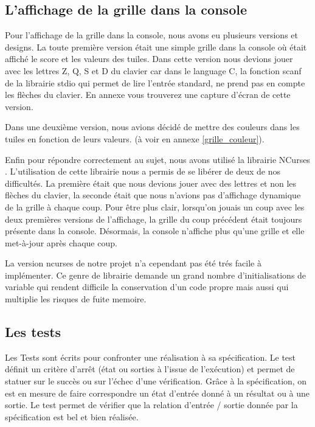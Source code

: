 \documentclass[12pt]{article}
\begin{document}
\subsection{L'affichage de la grille dans la console}
Pour l'affichage de la grille dans la console, nous avons eu plusieurs versions
et designs. La toute premi\`ere version \'etait une simple grille dans la console
o\`u \'etait affich\'e le score et les valeurs des tuiles. Dans cette version
nous devions jouer avec les lettres Z, Q, S et D du clavier car dans le language C, la
fonction \og scanf \fg{} de la librairie \og stdio \fg{} qui permet de
lire l'entr\'ee standard, ne prend pas en compte les fl\`eches du clavier.
En annexe vous trouverez une capture d'écran de cette version.\par
Dans une deuxi\`eme version, nous avions d\'ecid\'e de mettre des couleurs dans
les tuiles en fonction de leurs valeurs. (\`a voir en annexe \ref{grille_couleur}).\par
Enfin pour r\'epondre correctement au sujet, nous avons utilis\'e la librairie
\og NCurses \fg{}. L'utilisation de cette librairie nous a permis de se
lib\'erer de deux de nos difficult\'es. La premi\`ere \'etait que nous devions jouer
avec des lettres et non les fl\`eches du clavier, la seconde \'etait que nous
n'avions pas d'affichage dynamique de la grille \`a chaque coup. Pour \^etre plus
clair, lorsqu'on jouais un coup avec les deux premi\`eres versions de
l'affichage, la grille du coup pr\'ecédent \'etait toujours pr\'esente dans la
console. D\'esormais, la console n'affiche plus qu'une grille et elle met-\`a-jour apr\`es chaque coup.\par

La version ncurses de notre projet n'a cependant pas été trés facile à implémenter.
Ce genre de librairie demande un grand nombre d'initialisations de variable qui rendent
difficile la conservation d'un code propre mais aussi qui multiplie les risques de fuite memoire.

\subsection{Les tests}
Les Tests sont \'ecrits pour confronter une r\'ealisation \`a sa sp\'ecification.
Le test d\'efinit un crit\`ere d’arr\^et (\'etat ou sorties \`a l’issue de
l’ex\'ecution) et permet de statuer sur le succ\`es ou sur l’\'echec d’une
v\'erification. Gr\^ace \`a la sp\'ecification, on est en mesure de faire
correspondre un \'etat d’entr\'ee donn\'e \`a un r\'esultat ou \`a une sortie.
Le test permet de v\'erifier que la relation d’entr\'ee / sortie donn\'ee par la
sp\'ecification est bel et bien r\'ealis\'ee.
\cite{Test_unitaire}
\end{document}
